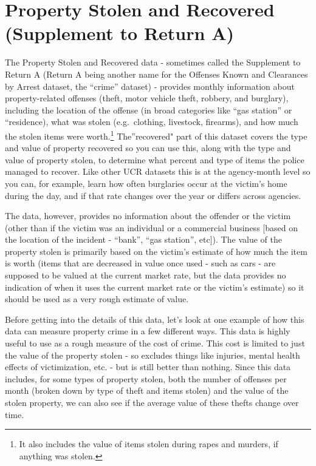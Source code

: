 \documentclass[
  12pt,
  openany]{book}
\begin{document}
\hypertarget{stolen_property}{%
\chapter{Property Stolen and Recovered (Supplement to Return A)}\label{stolen_property}}

The Property Stolen and Recovered data - sometimes called the Supplement to Return A (Return A being another name for the Offenses Known and Clearances by Arrest dataset, the ``crime'' dataset) - provides monthly information about property-related offenses (theft, motor vehicle theft, robbery, and burglary), including the location of the offense (in broad categories like ``gas station'' or ``residence), what was stolen (e.g.~clothing, livestock, firearms), and how much the stolen items were worth.\footnote{It also includes the value of items stolen during rapes and murders, if anything was stolen.} The''recovered" part of this dataset covers the type and value of property recovered so you can use this, along with the type and value of property stolen, to determine what percent and type of items the police managed to recover. Like other UCR datasets this is at the agency-month level so you can, for example, learn how often burglaries occur at the victim's home during the day, and if that rate changes over the year or differs across agencies.

The data, however, provides no information about the offender or the victim (other than if the victim was an individual or a commercial business {[}based on the location of the incident - ``bank'', ``gas station'', etc{]}). The value of the property stolen is primarily based on the victim's estimate of how much the item is worth (items that are decreased in value once used - such as cars - are supposed to be valued at the current market rate, but the data provides no indication of when it uses the current market rate or the victim's estimate) so it should be used as a very rough estimate of value.

Before getting into the details of this data, let's look at one example of how this data can measure property crime in a few different ways. This data is highly useful to use as a rough measure of the cost of crime. This cost is limited to just the value of the property stolen - so excludes things like injuries, mental health effects of victimization, etc. - but is still better than nothing. Since this data includes, for some types of property stolen, both the number of offenses per month (broken down by type of theft and items stolen) and the value of the stolen property, we can also see if the average value of these thefts change over time.
\end{document}
